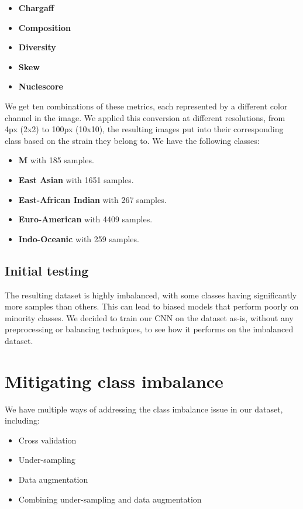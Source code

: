\begin{itemize}
	\item \textbf{Chargaff}
	\item \textbf{Composition}
	\item \textbf{Diversity}
	\item \textbf{Skew}
	\item \textbf{Nuclescore}
\end{itemize}

We get ten combinations of these metrics, each represented by a different color channel in the image. We applied this conversion at different
resolutions, from 4px (2x2) to 100px (10x10), the resulting images put into their corresponding class based on the strain they belong to. We
have the following classes:

\begin{itemize}
	\item \textbf{M} with 185 samples.
	\item \textbf{East Asian} with 1651 samples.
	\item \textbf{East-African Indian} with 267 samples.
	\item \textbf{Euro-American} with 4409 samples.
	\item \textbf{Indo-Oceanic} with 259 samples.
\end{itemize}


\subsection{Initial testing}
\label{subsec:initial_testing}

The resulting dataset is highly imbalanced, with some classes having significantly more samples than others. This can lead to biased models
that perform poorly on minority classes. We decided to train our CNN on the dataset as-is, without any preprocessing or balancing techniques,
to see how it performs on the imbalanced dataset.

\section{Mitigating class imbalance}
\label{sec:mitigating_class_imbalance}

We have multiple ways of addressing the class imbalance issue in our dataset, including:
\begin{itemize}
	\item Cross validation
	\item Under-sampling
	\item Data augmentation
	\item Combining under-sampling and data augmentation
\end{itemize}


